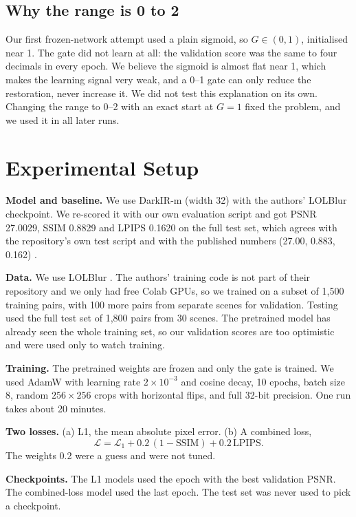 \documentclass[conference]{IEEEtran}
\begin{document}
\subsection{Why the range is 0 to 2}
Our first frozen-network attempt used a plain sigmoid, so $G\in(0,1)$, initialised near 1. The gate did not learn at all: the validation score was the same to four decimals in every epoch. We believe the sigmoid is almost flat near 1, which makes the learning signal very weak, and a 0--1 gate can only reduce the restoration, never increase it. We did not test this explanation on its own. Changing the range to 0--2 with an exact start at $G=1$ fixed the problem, and we used it in all later runs.

\section{Experimental Setup}
\textbf{Model and baseline.} We use DarkIR-m (width 32) with the authors' LOLBlur checkpoint. We re-scored it with our own evaluation script and got PSNR 27.0029, SSIM 0.8829 and LPIPS 0.1620 on the full test set, which agrees with the repository's own test script and with the published numbers (27.00, 0.883, 0.162) \cite{darkir}.

\textbf{Data.} We use LOLBlur \cite{lednet}. The authors' training code is not part of their repository and we only had free Colab GPUs, so we trained on a subset of 1{,}500 training pairs, with 100 more pairs from separate scenes for validation. Testing used the full test set of 1{,}800 pairs from 30 scenes. The pretrained model has already seen the whole training set, so our validation scores are too optimistic and were used only to watch training.

\textbf{Training.} The pretrained weights are frozen and only the gate is trained. We used AdamW \cite{adamw} with learning rate $2\times10^{-3}$ and cosine decay, 10 epochs, batch size 8, random $256\times256$ crops with horizontal flips, and full 32-bit precision. One run takes about 20 minutes.

\textbf{Two losses.} (a) L1, the mean absolute pixel error. (b) A combined loss,
\begin{equation}
\mathcal{L} = \mathcal{L}_1 + 0.2\,(1-\mathrm{SSIM}) + 0.2\,\mathrm{LPIPS}.
\end{equation}
The weights 0.2 were a guess and were not tuned.

\textbf{Checkpoints.} The L1 models used the epoch with the best validation PSNR. The combined-loss model used the last epoch. The test set was never used to pick a checkpoint.
\end{document}
